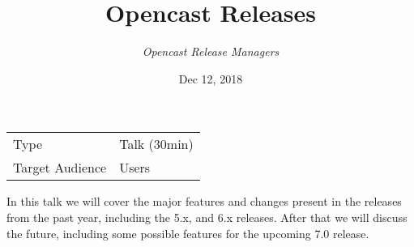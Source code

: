 \documentclass[a4paper]{article}
\title{Opencast Releases}
\date{Dec 12, 2018}
\author{\textit{Opencast Release Managers}}
\begin{document}
\maketitle

\begin{center}
\begin{tabular}{ll}
\toprule
	Type            & Talk (30min) \\
	Target Audience & Users \\
\bottomrule
\end{tabular}
\end{center}

\vspace{1em}

In this talk we will cover the major features and changes present in the
releases from the past year, including the 5.x, and 6.x releases.  After that we
will discuss the future, including some possible features for the upcoming 7.0
release.
\end{document}

